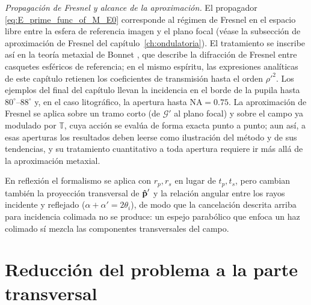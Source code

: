 \noindent\textit{Propagación de Fresnel y alcance de la aproximación.}
El propagador \eqref{eq:E_prime_func_of_M_E0} corresponde al régimen de
Fresnel en el espacio libre entre la esfera de referencia imagen y el plano
focal (véase la subsección de aproximación de Fresnel del
capítulo~\ref{ch:ondulatoria}). El tratamiento se inscribe así en la teoría
metaxial de Bonnet \cite{PellatFinet2009}, que describe la difracción de
Fresnel entre casquetes esféricos de referencia; en el mismo espíritu, las
expresiones analíticas de este capítulo retienen los coeficientes de
transmisión hasta el orden $\rho'^2$. Los ejemplos del final del capítulo
llevan la incidencia en el borde de la pupila hasta $80^\circ$--$88^\circ$ y,
en el caso litográfico, la apertura hasta $\mathrm{NA}=0.75$. La aproximación
de Fresnel se aplica sobre un tramo corto (de $\mathscr G'$ al plano focal) y
sobre el campo ya modulado por $\mathbb T$, cuya acción se evalúa de forma
exacta punto a punto; aun así, a esas aperturas los resultados deben leerse
como ilustración del método y de sus tendencias, y su tratamiento
cuantitativo a toda apertura requiere ir más allá de la aproximación
metaxial.

En reflexión el formalismo se aplica con $r_p,r_s$ en lugar de $t_p,t_s$, pero
cambian también la proyección transversal de $\bm{\hat{\mathbf{p}}}'$ y la relación angular
entre los rayos incidente y reflejado ($\alpha+\alpha'=2\theta_i$), de modo que
la cancelación descrita arriba para incidencia colimada no se produce: un
espejo parabólico que enfoca un haz colimado sí mezcla las componentes
transversales del campo.

\section{Reducción del problema a la parte transversal}

